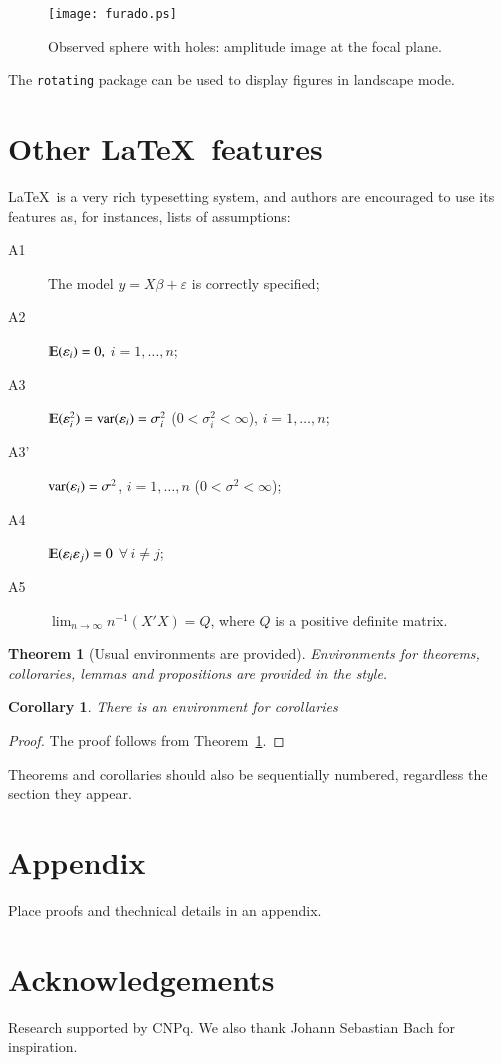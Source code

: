 \documentclass[12pt,twoside,reqno,final]{bjps}
\theoremstyle{plain}
\numberwithin{equation}{section}
\let\mathbb=\varmathbb
\def\E{{\mathbb E}}
\newtheorem{theorem}{Theorem}
\newtheorem{corollary}{Corollary}
\begin{document}
\begin{figure}[hbt]
\centering
\texttt{[image: furado.ps]}
\caption{Observed sphere with holes: amplitude image at the focal plane.}\label{fig:phantoms}
\end{figure}	

The \verb+rotating+ package can be used to display figures in landscape 
mode.

\section{Other \LaTeX\ features}

\LaTeX\ is a very rich typesetting system, and authors are encouraged to use its features as, for instances, lists of assumptions:
\begin{description}
\item[A1] The model $y=X\beta + \varepsilon$ is correctly specified; 
\item[A2] $\E(\varepsilon_i)=0,$ $i=1,\ldots,n$;
\item[A3] $\E(\varepsilon_i ^2)= {\rm var}(\varepsilon_i) = \sigma_i^2$
($0 < \sigma_i^2 < \infty$), $i=1,\ldots,n$;
\item[A3'] ${\rm var}(\varepsilon_i) = \sigma^2$, $i=1,\ldots,n$
($0< \sigma^2 < \infty$);
\item[A4] $\E(\varepsilon_i \varepsilon_j)=0$ $\forall \, i\neq j$;
\item[A5] $\lim_{n\rightarrow\infty} n^{-1}(X'X) = Q$, where 
$Q$ is a positive definite matrix. 
\end{description}

\begin{theorem}[Usual environments are provided]\label{theo:1}
Environments for theorems, colloraries, lemmas and propositions are provided in the style.
\end{theorem}

\begin{corollary}There is an environment for corollaries
\end{corollary}

\begin{proof}
The proof follows from Theorem~\ref{theo:1}.
\end{proof}

Theorems and corollaries should also be sequentially numbered, regardless the section they appear.

\section*{Appendix}

Place proofs and thechnical details in an appendix. 

\section*{Acknowledgements}

Research supported by CNPq. We also thank Johann Sebastian Bach for inspiration.


\small



\end{document}
